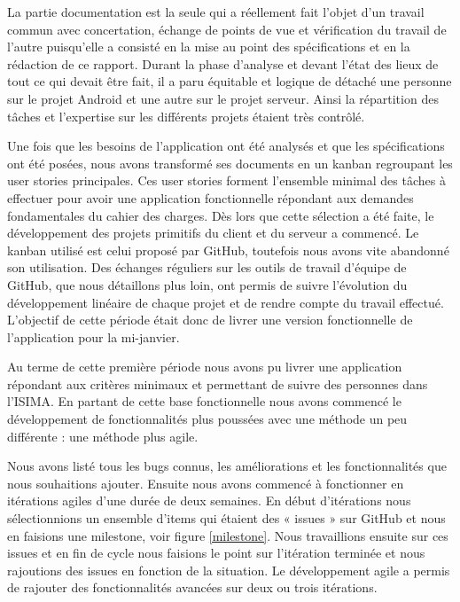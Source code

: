 La partie documentation est la seule qui a réellement fait l’objet d’un travail commun avec concertation, échange de points de vue et vérification du travail de l’autre puisqu’elle a consisté en la mise au point des spécifications et en la rédaction de ce rapport. Durant la phase d’analyse et devant l’état des lieux de tout ce qui devait être fait, il a paru équitable et logique de détaché une personne sur le projet Android et une autre sur le projet serveur. Ainsi la répartition des tâches et l’expertise sur les différents projets étaient très contrôlé.

Une fois que les besoins de l’application ont été analysés et que les spécifications ont été posées, nous avons transformé ses documents en un kanban regroupant les user stories principales. Ces user stories forment l’ensemble minimal des tâches à effectuer pour avoir une application fonctionnelle répondant aux demandes fondamentales du cahier des charges. Dès lors que cette sélection a été faite, le développement des projets primitifs du client et du serveur a commencé. Le kanban utilisé est celui proposé par GitHub, toutefois nous avons vite abandonné son utilisation. Des échanges réguliers sur les outils de travail d’équipe de GitHub, que nous détaillons plus loin, ont permis de suivre l’évolution du développement linéaire de chaque projet et de rendre compte du travail effectué. L’objectif de cette période était donc de livrer une version fonctionnelle de l’application pour la mi-janvier.

Au terme de cette première période nous avons pu livrer une application répondant aux critères minimaux et permettant de suivre des personnes dans l’ISIMA. En partant de cette base fonctionnelle nous avons commencé le développement de fonctionnalités plus poussées avec une méthode un peu différente : une méthode plus agile.

Nous avons listé tous les bugs connus, les améliorations et les fonctionnalités que nous souhaitions ajouter. Ensuite nous avons commencé à fonctionner en itérations agiles d’une durée de deux semaines. En début d’itérations nous sélectionnions un ensemble d’items qui étaient des « issues » sur GitHub et nous en faisions une milestone, voir figure \ref{milestone}. Nous travaillions ensuite sur ces issues et en fin de cycle nous faisions le point sur l’itération terminée et nous rajoutions des issues en fonction de la situation. Le développement agile a permis de rajouter des fonctionnalités avancées sur deux ou trois itérations.

